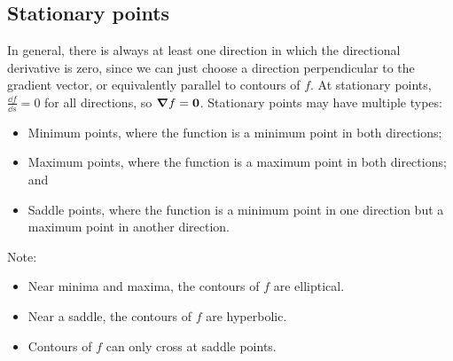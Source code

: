 \subsection{Stationary points}
In general, there is always at least one direction in which the directional derivative is zero, since we can just choose a direction perpendicular to the gradient vector, or equivalently parallel to contours of \(f\).
At stationary points, \(\frac{\dd{f}}{\dd{s}} = 0\) for all directions, so \(\grad f = \vb 0\).
Stationary points may have multiple types:
\begin{itemize}
	\item Minimum points, where the function is a minimum point in both directions;
	\item Maximum points, where the function is a maximum point in both directions; and
	\item Saddle points, where the function is a minimum point in one direction but a maximum point in another direction.
\end{itemize}
Note:
\begin{itemize}
	\item Near minima and maxima, the contours of \(f\) are elliptical.
	\item Near a saddle, the contours of \(f\) are hyperbolic.
	\item Contours of \(f\) can only cross at saddle points.
\end{itemize}


